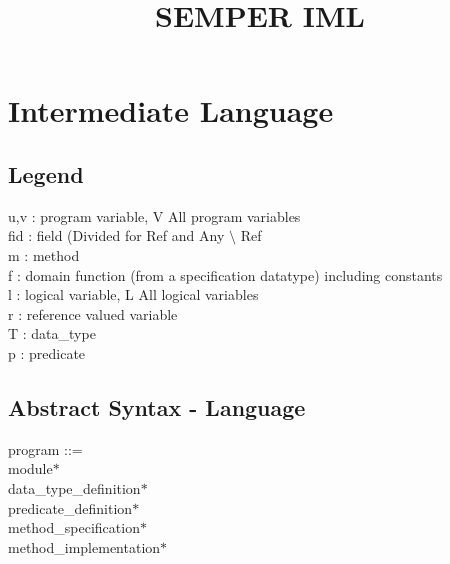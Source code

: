\documentclass{paper}
\title{SEMPER IML}
\begin{document}
	\section{Intermediate Language}
	
	
	
	\subsection{Legend}
	
	\begin{tabbing}
 			u,v : program variable, V All program variables \\
 			fid : field (Divided for Ref and Any $\setminus$ Ref \\
 			m : method \\
 			
 			f : domain function (from a specification datatype) including constants \\
 			
 			l : logical variable, L All logical variables \\
			r : reference valued variable \\
			 			
 			T : data\_type \\

			p : predicate \\
			
	\end{tabbing}

	\subsection{Abstract Syntax - Language}

	\begin{tabbing}
 			program ::= \\
 			\indent module$\ast$     \\
 			\indent data\_type\_definition$\ast$   \\
 			\indent predicate\_definition$\ast$   \\
 			\indent method\_specification$\ast$  \\
 			\indent method\_implementation$\ast$  \\
	\end{tabbing}
\end{document}
